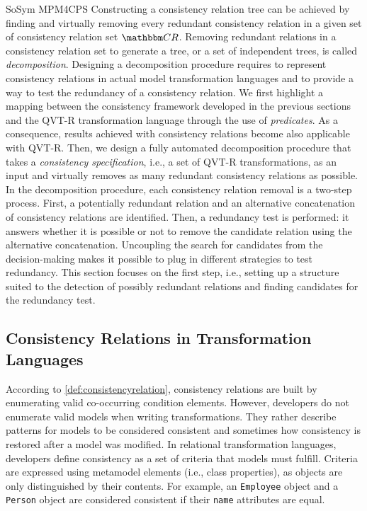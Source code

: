 \begin{copiedFrom}{SoSym MPM4CPS}
Constructing a consistency relation tree can be achieved by finding and virtually removing every redundant consistency relation in a given set of consistency relation set $\consistencyrelationset{CR}$. %
%
Removing redundant relations in a consistency relation set to generate a tree, or a set of independent trees, is called \textit{decomposition}. Designing a decomposition procedure requires to represent consistency relations in actual model transformation languages and to provide a way to test the redundancy of a consistency relation. We first highlight a mapping between the consistency framework developed in the previous sections and the QVT-R transformation language through the use of \textit{predicates}. As a consequence, results achieved with consistency relations become also applicable with QVT-R. Then, we design a fully automated decomposition procedure that takes a \emph{consistency specification}, i.e., a set of QVT-R transformations, as an input and virtually removes as many redundant consistency relations as possible. In the decomposition procedure, each consistency relation removal is a two-step process. First, a potentially redundant relation and an alternative concatenation of consistency relations are identified. Then, a redundancy test is performed: it answers whether it is possible or not to remove the candidate relation using the alternative concatenation. Uncoupling the search for candidates from the decision-making makes it possible to plug in different strategies to test redundancy. This section focuses on the first step, i.e., setting up a structure suited to the detection of possibly redundant relations and finding candidates for the redundancy test.

\subsection{Consistency Relations in Transformation Languages}

According to \autoref{def:consistencyrelation}, consistency relations are built by enumerating valid co-occurring condition elements. However, developers do not enumerate valid models when writing transformations. %
They rather describe patterns for models to be considered consistent and sometimes how consistency is restored after a model was modified. %
In relational transformation languages, developers define consistency as a set of criteria that models must fulfill. Criteria are expressed using metamodel elements (i.e., class properties), as objects are only distinguished by their contents. For example, an \texttt{Employee} object and a \texttt{Person} object are considered consistent if their \texttt{name} attributes are equal.


\end{copiedFrom}
